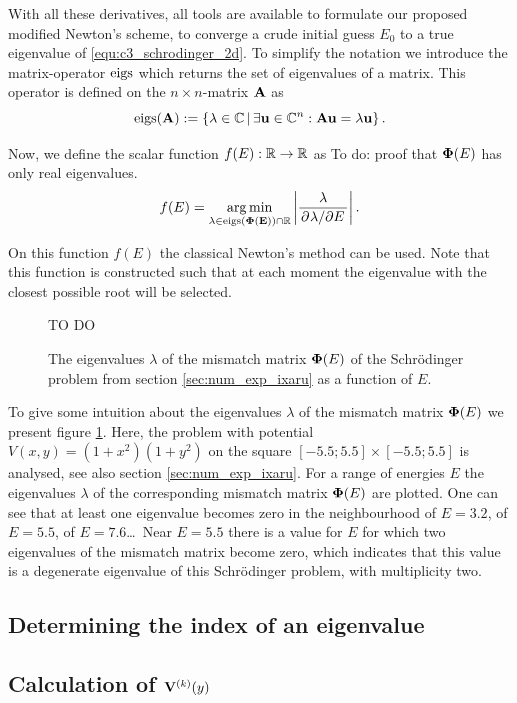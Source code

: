 With all these derivatives, all tools are available to formulate our proposed modified Newton's scheme, to converge a crude initial guess $E_0$ to a true eigenvalue of \eqref{equ:c3_schrodinger_2d}. To simplify the notation we introduce the matrix-operator $\operatorname{eigs}$ which returns the set of eigenvalues of a matrix. This operator is defined on the $n \times n$-matrix $\vb{A}$ as
$$
    \operatorname{eigs}(\vb{A}) := \left\{\lambda \in \mathbb{C} \, | \, \exists \vb{u} \in \mathbb{C}^n : \vb{A} \vb{u} = \lambda \vb{u} \right\}\text{.}
$$

Now, we define the scalar function $f(E) : \mathbb{R} \to \mathbb{R}$ as {\color{red}To do: proof that $\vb{\Phi}(E)$ has only real eigenvalues.}
$$
f(E) = \operatorname*{arg\,min}_{\lambda \in \operatorname{eigs}(\vb{\Phi(E)}) \cap \mathbb{R}} \left|\frac{\lambda}{\pdv*[]{\lambda}{E}}\right|\text{.}
$$

On this function $f(E)$ the classical Newton's method can be used. Note that this function is constructed such that at each moment the eigenvalue with the closest possible root will be selected.

\begin{figure}
    \centering
    TO DO
    \caption{\label{fig:rainbow} The eigenvalues $\lambda$ of the mismatch matrix $\vb{\Phi}(E)$ of the Schrödinger problem from section \ref{sec:num_exp_ixaru} as a function of $E$. }
\end{figure}


To give some intuition about the eigenvalues $\lambda$ of the mismatch matrix $\vb{\Phi}(E)$ we present figure \ref{fig:rainbow}. Here, the problem with potential $V(x, y) = (1+x^2)(1+y^2)$ on the square $[-5.5; 5.5]\times[-5.5; 5.5]$ is analysed, see also section \ref{sec:num_exp_ixaru}. For a range of energies $E$ the eigenvalues $\lambda$ of the corresponding mismatch matrix $\vb{\Phi}(E)$ are plotted. One can see that at least one eigenvalue becomes zero in the neighbourhood of $E=3.2$, of $E=5.5$, of $E=7.6$\dots\ Near $E=5.5$ there is a value for $E$ for which two eigenvalues of the mismatch matrix become zero,
which indicates that this value is a degenerate eigenvalue of this Schrödinger problem, with multiplicity two.

\subsection{Determining the index of an eigenvalue}\label{sec:c3_index_of_e}

\subsection{Calculation of \texorpdfstring{$\vb{V}^{(k)}(y)$}{Vk(y)}}\label{sec:c3_calculate_vk}


